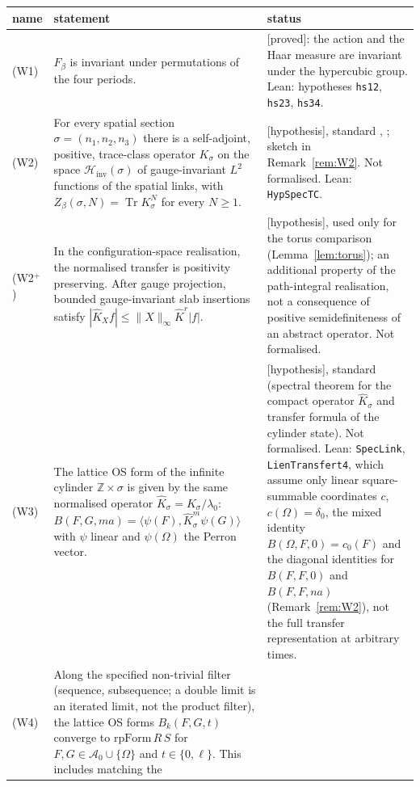 \documentclass[11pt,a4paper]{article}
\theoremstyle{plain}
\theoremstyle{definition}
\theoremstyle{remark}
\numberwithin{equation}{section}
\newcommand{\Z}{\mathbb{Z}}
\newcommand{\Tr}{\operatorname{Tr}}
\newcommand{\Hinv}{\mathcal{H}_{\mathrm{inv}}}
\newcommand{\Kh}{\widehat K}
\newcommand{\st}[1]{\textsf{[#1]}}
\newcommand{\cA}{\mathcal{A}}
\begin{document}
\begin{table}[ht]
\centering\footnotesize
\begin{tabular}{@{}>{\raggedright\arraybackslash}p{}>{\raggedright\arraybackslash}p{}%
>{\raggedright\arraybackslash}p{}@{}}
\toprule
name & statement & status \\
\midrule
(W1) & $F_\beta$ is invariant under permutations of the four periods. & \st{proved}: the action and the Haar measure are invariant
under the hypercubic group. Lean: hypotheses \texttt{hs12}, \texttt{hs23}, \texttt{hs34}.\\
(W2) & For every spatial section $\sigma=(n_1,n_2,n_3)$ there is a self-adjoint, positive, trace-class operator $K_\sigma$ on the space
$\Hinv(\sigma)$ of gauge-invariant $L^2$ functions of the spatial links, with $Z_\beta(\sigma,N)=\Tr K_\sigma^N$ for every $N\ge1$. &
\st{hypothesis}, standard \cite{Lus77}, \cite[\S2.3, Thm.~2.1]{OS78}; sketch in Remark~\ref{rem:W2}. Not formalised. Lean:
\texttt{HypSpecTC}.\\
(W2$^+$) & In the configuration-space realisation, the normalised transfer is positivity preserving. After gauge projection, bounded
gauge-invariant slab insertions satisfy $|\Kh_Xf|\le\|X\|_\infty\Kh^r|f|$. & \st{hypothesis}, used only for the torus comparison
(Lemma~\ref{lem:torus}); an additional property of the path-integral realisation, not a consequence of positive semidefiniteness of an abstract
operator. Not formalised.\\
(W3) & The lattice OS form of the infinite cylinder $\Z\times\sigma$ is given by the same normalised operator $\Kh_\sigma=K_\sigma/\lambda_0$:
$B(F,G,ma)=\langle\psi(F),\Kh_\sigma^m\psi(G)\rangle$ with $\psi$ linear and $\psi(\Omega)$ the Perron vector. & \st{hypothesis},
standard (spectral theorem for the compact operator $\Kh_\sigma$ and transfer formula of the cylinder state). Not formalised. Lean:
\texttt{SpecLink}, \texttt{LienTransfert4}, which assume only linear square-summable coordinates $c$, $c(\Omega)=\delta_0$, the mixed identity $B(\Omega,F,0)=c_0(F)$ and the diagonal identities for $B(F,F,0)$ and $B(F,F,na)$ (Remark~\ref{rem:W2}), not the full transfer representation at arbitrary times.\\
(W4) & Along the specified non-trivial filter (sequence, subsequence; a double limit is an iterated limit, not the product filter), the
lattice OS forms $B_k(F,G,t)$ converge to $\mathrm{rpForm}\,R\,S$ for $F,G\in\cA_0\cup\{\Omega\}$ and $t\in\{0,\ell\}$. This includes matching the

\end{tabular}
\end{table}
\end{document}
